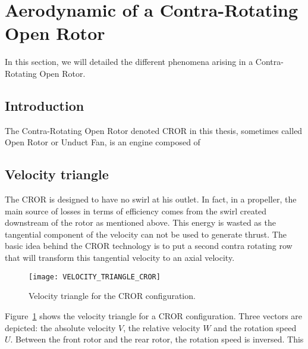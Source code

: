 
\section{Aerodynamic of a Contra-Rotating Open Rotor} %
\label{sec:aerodynamic_of_a_contra_rotating_open_rotor}

In this section, we will detailed the different phenomena
arising in a Contra-Rotating Open Rotor.

\subsection{Introduction} %
\label{sub:introduction}

The Contra-Rotating Open Rotor denoted CROR in this thesis, sometimes
called Open Rotor or Unduct Fan, is an engine composed of 


\subsection{Velocity triangle} %
\label{sub:velocity_triangle}

The CROR is designed to have no swirl at his outlet. In fact,
in a propeller, the main source of losses in terms
of efficiency comes from the swirl created downstream of
the rotor as mentioned above. This energy is wasted as the tangential component
of the velocity can not be used to generate thrust.
The basic idea behind the CROR technology is to put a
second contra rotating row that will transform this
tangential velocity to an axial velocity.
\begin{figure}[htbp]
  \centering
  \texttt{[image: VELOCITY\_TRIANGLE\_CROR]}
  \caption{Velocity triangle for the CROR configuration.}
  \label{fig:VELOCITY_TRIANGLE_CROR}
\end{figure}

Figure~\ref{fig:VELOCITY_TRIANGLE_CROR} shows the velocity triangle for
a CROR configuration. Three vectors are depicted: the absolute velocity
$V$, the relative velocity $W$ and the rotation speed $U$. Between
the front rotor and the rear rotor, the rotation speed is inversed.
This









